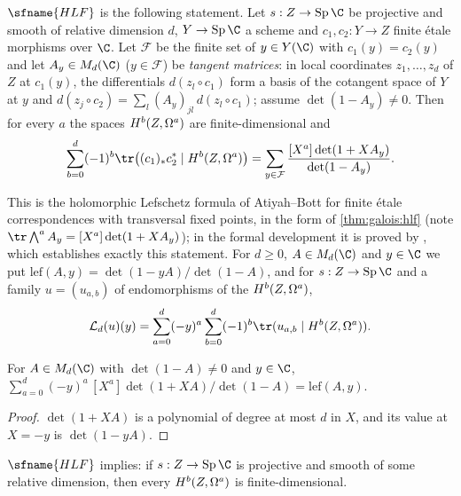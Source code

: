 \begin{definition}\label{pf:ks1:def-hlf}
$\sfname{HLF}$ is the following statement. Let $s:Z\to\ksoneSp\C$ be projective and smooth of relative dimension $d$,
$Y\to\ksoneSp\C$ a scheme and $c_1,c_2:Y\to Z$ finite \'etale morphisms over $\C$. Let $\mathcal F$ be the finite set
of $y\in Y(\C)$ with $c_1(y)=c_2(y)$ and let $A_y\in M_d(\C)$ ($y\in\mathcal F$) be \emph{tangent matrices}: in local
coordinates $z_1,\dots,z_d$ of $Z$ at $c_1(y)$, the differentials $d(z_l\circ c_1)$ form a basis of the cotangent space of $Y$
at $y$ and $d(z_j\circ c_2)=\sum_l(A_y)_{jl}\,d(z_l\circ c_1)$; assume $\det(1-A_y)\neq0$. Then for every $a$ the spaces
$\ksoneH{Z}{a}{b}$ are finite-dimensional and
\begin{equation}\label{pf:ks1:eq-hlf}
\sum_{b=0}^{d}(-1)^b\tr\bigl((c_1)_*c_2^*\mid\ksoneH{Z}{a}{b}\bigr)=\sum_{y\in\mathcal F}\frac{[X^a]\det(1+XA_y)}{\det(1-A_y)}.
\end{equation}
\end{definition}

This is the holomorphic Lefschetz formula of Atiyah--Bott \cite{AtiyahBott1968} for finite \'etale correspondences with
transversal fixed points, in the form of \cref{thm:galois:hlf} (note $\tr\bigwedge^aA_y=[X^a]\det(1+XA_y)$); in the formal development it is proved
by , which establishes exactly this statement. For $d\ge0$, $A\in M_d(\C)$ and $y\in\C$ we put
$\mathrm{lef}(A,y)=\det(1-yA)/\det(1-A)$, and for $s:Z\to\ksoneSp\C$ and a family $u=(u_{a,b})$ of endomorphisms of the
$\ksoneH{Z}{a}{b}$,
\begin{equation}\label{pf:ks1:eq-alttr}
\mathcal L_d(u)(y)=\sum_{a=0}^d(-y)^a\sum_{b=0}^d(-1)^b\tr(u_{a,b}\mid\ksoneH{Z}{a}{b}).
\end{equation}

\begin{lemma}\label{pf:ks1:lem-lefsum}
For $A\in M_d(\C)$ with $\det(1-A)\neq0$ and $y\in\C$,
$\sum_{a=0}^d(-y)^a\,[X^a]\det(1+XA)/\det(1-A)=\mathrm{lef}(A,y)$.
\end{lemma}

\begin{proof}
$\det(1+XA)$ is a polynomial of degree at most $d$ in $X$, and its value at $X=-y$ is $\det(1-yA)$.
\end{proof}

\begin{lemma}\label{pf:ks1:lem-hodgefin}
$\sfname{HLF}$ implies: if $s:Z\to\ksoneSp\C$ is projective and smooth of some relative dimension, then every
$\ksoneH{Z}{a}{b}$ is finite-dimensional.
\end{lemma}

